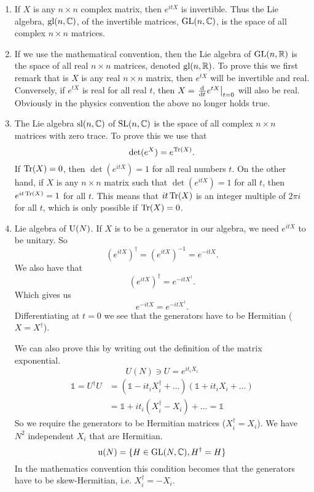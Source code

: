 \begin{example}
\begin{enumerate}
\item If $X$ is any $n\times n$ complex matrix, then $e^{itX}$ is invertible. Thus the Lie algebra, $\operatorname{gl}(n,\mathbb{C})$, of the invertible matrices, $\operatorname{GL}(n,\mathbb{C})$, is the space of all complex $n\times n$ matrices.
\item If we use the mathematical convention, then the Lie algebra of $\operatorname{GL}(n,\mathbb{R})$ is the space of all real $n\times n$ matrices, denoted $\operatorname{gl}(n,\mathbb{R})$. To prove this we first remark that is $X$ is any real $n\times n$ matrix, then $e^{tX}$ will be invertible and real. Conversely, if $e^{tX}$ is real for all real $t$, then $X=\left.\od{}{t}e^{tX}\right|_{t=0}$ will also be real. Obviously in the physics convention the above no longer holds true.

\item The Lie algebra $\operatorname{sl}(n,\mathbb{C})$ of $\operatorname{SL}(n,\mathbb{C})$ is the space of all complex $n \times n$ matrices with zero trace. To prove this we use that
\[ \det(e^X) = e^{\operatorname{Tr}(X)}. \]
If $\operatorname{Tr}(X) = 0$, then $\det(e^{itX}) = 1$ for all real numbers $t$. On the other hand, if $X$ is any $n\times n$ matrix such that $\det(e^{itX}) =1$ for all $t$, then $e^{it\operatorname{Tr}(X)} = 1$ for all $t$. This means that $it\operatorname{Tr}(X)$ is an integer multiple of $2\pi i$ for all $t$, which is only possible if $\operatorname{Tr}(X) = 0$.

\item Lie algebra of $\operatorname{U}(N)$. If $X$ is to be a generator in our algebra, we need $e^{itX}$ to be unitary. So
\[ \left(e^{itX}\right)^\dagger = \left(e^{itX}\right)^{-1} = e^{-itX}. \]
We also have that
\[ \left(e^{itX}\right)^\dagger = e^{-itX^\dagger}. \]
Which gives us
\[ e^{-itX} = e^{-itX^\dagger}. \]
Differentiating at $t=0$ we see that the generators have to be Hermitian ($X = X^\dagger$).

We can also prove this by writing out the definition of the matrix exponential. 
\[ U(N) \ni U = e^{it_iX_i} \]
\begin{align}
\mathbb{1} = U^\dagger U &= (\mathbb{1}-it_i X_i^\dagger + \ldots )(\mathbb{1}+it_i X_i + \ldots) \\
&= \mathbb{1} + it_i(X_i^\dagger - X_i) + \ldots = \mathbb{1}
\end{align}
So we require the generators to be Hermitian matrices ($X_i^\dagger = X_i$). We have $N^2$ independent $X_i$ that are Hermitian. 
\[ \operatorname{u}(N) = \{ H \in \operatorname{GL}(N,\mathbb{C}), H^\dagger = H \} \]
In the mathematics convention this condition becomes that the generators have to be skew-Hermitian, i.e. $X_i^\dagger = -X_i$.


\end{enumerate}
\end{example}
